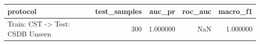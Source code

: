 \begin{tabular}{lrrrr}
\toprule
protocol & test_samples & auc_pr & roc_auc & macro_f1 \\
\midrule
Train: CST -> Test: CSDB Unseen & 300 & 1.000000 & NaN & 1.000000 \\
\bottomrule
\end{tabular}
